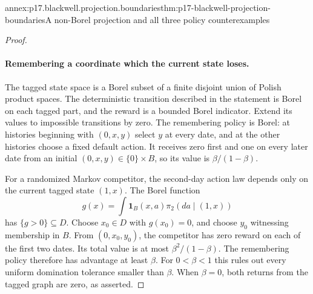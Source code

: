 \begin{annexitem}{annex:p17.blackwell.projection.boundaries}{thm:p17-blackwell-projection-boundaries}{A non-Borel projection and all three policy counterexamples}
\begin{proof}
\paragraph{Remembering a coordinate which the current state loses.}
The tagged state space is a Borel subset of a finite
disjoint union of Polish product spaces.
The deterministic transition described in the statement is
Borel on each tagged part, and the reward is a bounded
Borel indicator. Extend its values to impossible transitions
by zero. The remembering policy is Borel: at histories
beginning with \((0,x,y)\) select \(y\) at every date,
and at the other histories choose a fixed default action.
It receives zero first and one on every later date from
an initial \((0,x,y)\in\{0\}\times B\), so its value is
\(\beta/(1-\beta)\).

For a randomized Markov competitor, the second-day action
law depends only on the current tagged state \((1,x)\).
The Borel function
\[
 g(x)=\int\mathbf1_B(x,a)\pi_2(da\mid(1,x))
\]
has \(\{g>0\}\subseteq D\). Choose \(x_0\in D\) with
\(g(x_0)=0\), and choose \(y_0\) witnessing membership
in \(B\). From \((0,x_0,y_0)\), the competitor has zero
reward on each of the first two dates. Its total value
is at most \(\beta^2/(1-\beta)\).
The remembering policy therefore has advantage at least
\(\beta\). For \(0<\beta<1\) this rules out every
uniform domination tolerance smaller than \(\beta\).
When \(\beta=0\), both returns from the tagged graph
are zero, as asserted.
\end{proof}
\end{annexitem}

